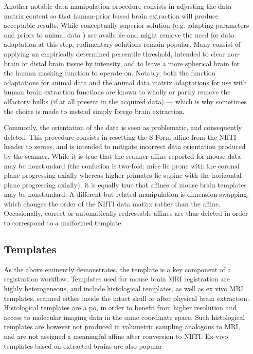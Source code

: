 Another notable data manipulation procedure consists in adjusting the data matrix content so that human-prior based brain extraction will produce acceptable results.
While conceptually superior solution (e.g. adapting parameters and priors to animal data \cite{rbet,Oguz2014}) are available and might remove the need for data adaptation at this step, rudimentary solutions remain popular.
Many consist of applying an empirically determined percentile threshold, intended to clear non-brain or distal brain tissue by intensity, and to leave a more spherical brain for the human masking function to operate on.
Notably, both the function adaptations for animal data and the animal data matrix adaptations for use with human brain extraction functions are known to wholly or partly remove the olfactory bulbs (if at all present in the acquired data) --- which is why sometimes the choice is made to instead simply forego brain extraction.

Commonly, the orientation of the data is seen as problematic, and consequently deleted.
This procedure consists in resetting the S-Form affine from the NIfTI header to zeroes, and is intended to mitigate incorrect data orientation produced by the scanner.
While it is true that the scanner affine reported for mouse data may be nonstandard (the confusion is two-fold: mice lie prone with the coronal plane progressing axially whereas higher primates lie supine with the horizontal plane progressing axially), it is equally true that affines of mouse brain templates may be nonstandard.
A different but related manipulation is dimension swapping, which changes the order of the NIfTI data matirx rather than the affine.
Occasionally, correct or automatically redressable affines are thus deleted in order to correspond to a malformed template.

\subsection{Templates}
As the above eminently demonstrates, the template is a key component of a registration workflow.
Templates used for mouse brain MRI registration are highly heterogeneous, and include histological templates, as well as ex vivo MRI templates, scanned either inside the intact skull or after physical brain extraction.
Histological templates are a po, in order to benefit from higher resolution and access to molecular imaging data in the same coordinate space.
Such histological templates are however not produced in volumetric sampling analogous to MRI, and are not assigned a meaningful affine after conversion to NIfTI.
Ex-vivo templates based on extracted brains are also popular

